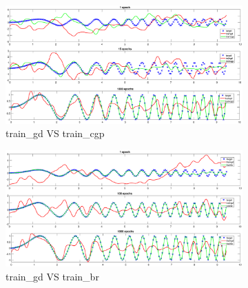 \begin{figure}[ht]
\begin{subfigure}[b]{0.33\textwidth}
		\captionsetup{width=0.8\linewidth, format = hang}
		\includegraphics[height = 0.7\textwidth,width = 1\textwidth]{Exercise1/Report/train_gd_cgp}
		\caption{train\_gd VS  train\_cgp}\label{fig:train_gd_cgp}
	\end{subfigure}
	\begin{subfigure}[b]{0.33\textwidth}
		\centering
		\captionsetup{width=0.8\linewidth, format = hang}
		\includegraphics[height = 0.7\textwidth,width = 1\textwidth]{Exercise1/Report/train_gd_br}
		\caption{train\_gd VS  train\_br}\label{fig:train_gd_br)}
	\end{subfigure}%
	\begin{subfigure}[b]{0.33\textwidth}
		\centering
		\captionsetup{width=0.8\linewidth, format = hang}

\end{subfigure}
\end{figure}
